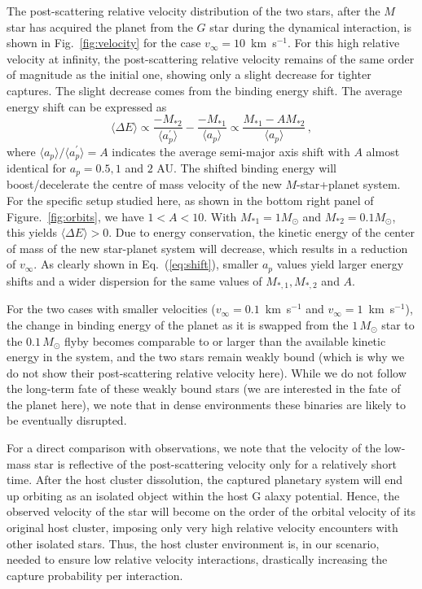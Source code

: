 \documentclass[twocolumn]{aastex62}
\begin{document}
The post-scattering relative velocity distribution of the two stars,  after the $M$ star has  acquired the planet from the $G$ star during the dynamical
interaction, is shown in Fig.~\ref{fig:velocity}
for the case $v_\infty=10$~km~s$^{-1}$. For this high relative velocity at infinity, the post-scattering relative velocity remains of the same order of magnitude as the initial one, showing only a slight decrease for tighter
captures.  The slight decrease comes from the binding energy shift. The average energy shift can be expressed as
\begin{equation}\label{eq:shift}
\langle \Delta E \rangle \propto \frac{-M_{*2}}{\langle a_p^\prime \rangle} - \frac{-M_{*1}}{\langle a_p \rangle }\propto \frac{M_{*1}-AM_{*2}}{\langle a_p \rangle}\,,
\end{equation}
where $\langle a_p \rangle /\langle a_p^\prime \rangle =A$ indicates the average semi-major axis shift with $A$ almost identical for $a_p=0.5,1$ and $2$ AU. The shifted binding energy will boost/decelerate the centre of mass velocity of the new $M$-star+planet system. For the specific setup studied here, as shown in the bottom right panel of Figure.~\ref{fig:orbits}, we have $1<A<10$. With $M_{*1}=1M_\odot$ and $M_{*2}=0.1M_\odot$, this yields $\langle \Delta E\rangle > 0$. Due to  energy conservation, the kinetic energy of the center of mass of the new star-planet system will decrease, which results in a reduction of $v_\infty$. As clearly shown in Eq.~(\ref{eq:shift}), smaller $a_p$ values yield larger energy shifts and a wider dispersion for the same values of 
$M_{*,1}, M_{*,2}$ and
 $A$. 

For the two cases with smaller velocities  
($v_\infty=0.1$~km~s$^{-1}$ and $v_\infty=1$~km~s$^{-1}$), the change in binding energy of the planet as it is swapped from the $1\,M_\odot$ star to the $0.1\,M_\odot$ flyby becomes
comparable to or larger than the available kinetic energy in the system, and the two stars remain weakly bound (which is why we do not show their post-scattering relative velocity here). While we do not follow the long-term fate of these weakly bound stars (we are interested in the fate of the planet here), we note that in dense environments these binaries are likely to be eventually disrupted.

For a direct comparison with observations, we note that the velocity of the low-mass star is reflective of the post-scattering
velocity only for a relatively short time. After the host cluster dissolution, the captured planetary system will end up orbiting as an isolated object within the host G
alaxy potential.  Hence, the observed velocity of the star will become on the order of the orbital velocity of its original host cluster, imposing only very high relative velocity encounters with other isolated stars.  Thus, the host cluster environment is, in our scenario, needed to ensure low relative velocity interactions, drastically increasing the capture probability per interaction. 
\end{document}
